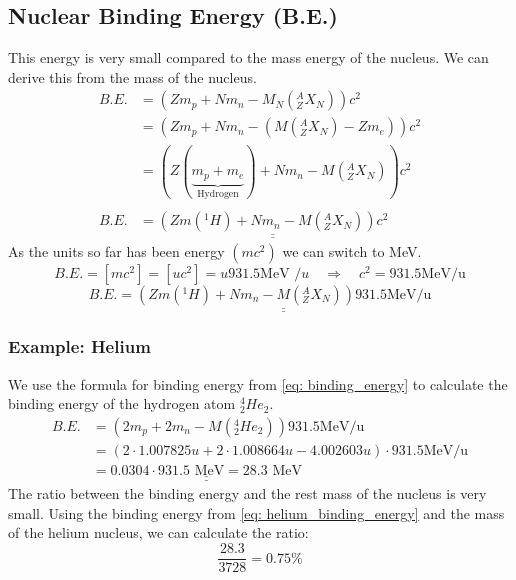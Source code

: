\subsection{Nuclear Binding Energy (B.E.)}
This energy is very small compared to the mass energy of the nucleus. We can derive this from the mass of the nucleus. 
\begin{align}
    B.E. &= \left(Zm_{p} + Nm_{n} - M_{N}\left(_{Z}^{A}X_{N}\right)\right) c^2 \\
    &= \left(Zm_{p} + Nm_{n} - \left(M\left(_{Z}^{A}X_{N}\right) - Zm_e\right)\right) c^2 \\ 
    &= \left(Z(\underbrace{m_{p} + m_e}_{\text{Hydrogen}}) + Nm_{n} - M\left(_{Z}^{A}X_{N}\right)\right) c^2 \\ \\
   B.E. &= \underline{\underline{\left(Zm\left(^{1}H\right) + Nm_{n} - M\left(_{Z}^{A}X_{N}\right)\right) c^2}}
\end{align}
As the units so far has been energy $(mc^2)$ we can switch to MeV. 
\begin{equation}
B.E. = \left[mc^2\right] = \left[uc^2\right] = u931.5\text{MeV /}u \quad ⇒ \quad c^2 = 931.5 \text{MeV/u}
\end{equation}
\begin{equation}\label{eq: binding_energy}
B.E. = \underline{\underline{\left(Zm\left(^{1}H\right) + Nm_{n} - M\left(_{Z}^{A}X_{N}\right)\right) 931.5 \text{MeV/u}}}
\end{equation}

\subsubsection{Example: Helium }
We use the formula for binding energy from \cref{eq: binding_energy} to calculate the binding energy of the hydrogen atom $_{2}^{4}He_{2}$.
\begin{align}
B.E. &= \left(2m_p + 2m_n - M\left(_{2}^{4}He_{2}\right)\right) 931.5 \text{MeV/u} \\
&= \left(2 ⋅ 1.007825u + 2 ⋅ 1.008664u - 4.002603u\right) ⋅ 931.5 \text{MeV/u} \\
&= \underline{\underline{0.0304 ⋅  931.5 \text{ MeV} = 28.3 \text{ MeV}}}\label{eq: helium_binding_energy}
\end{align}
The ratio between the binding energy and the rest mass of the nucleus is very small. Using the binding energy from \cref{eq: helium_binding_energy} and the mass of the helium nucleus, we can calculate the ratio:
\begin{equation}
\frac{28.3}{3728} = 0.75\%
\end{equation}
